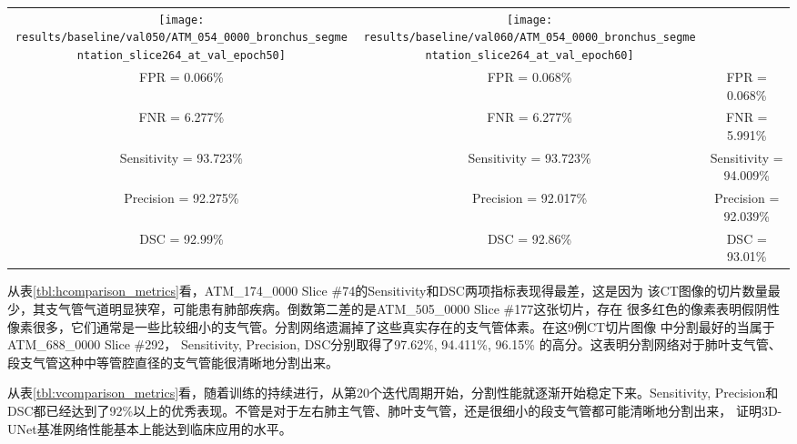\begin{enumerate}
\begin{table}[ht]
{\begin{tabular}{|c|c|c|}
            \texttt{[image: results/baseline/val050/ATM\_054\_0000\_bronchus\_segmentation\_slice264\_at\_val\_epoch50]} & 
            \texttt{[image: results/baseline/val060/ATM\_054\_0000\_bronchus\_segmentation\_slice264\_at\_val\_epoch60]} \\
            FPR = 0.066\%          & FPR = 0.068\%             & FPR = 0.068\% \\
            FNR = 6.277\%          & FNR = 6.277\%             & FNR = 5.991\% \\
            Sensitivity = 93.723\% & Sensitivity = 93.723\%    & Sensitivity = 94.009\% \\
            Precision = 92.275\%   & Precision = 92.017\%      & Precision = 92.039\% \\
            DSC = 92.99\%          & DSC = 92.86\%             & DSC = 93.01\% \\
            \hline
        \end{tabular}
        }
    \end{table}

\end{enumerate}

从表\ref{tbl:hcomparison_metrics}看，ATM\_174\_0000 Slice \#74的Sensitivity和DSC两项指标表现得最差，这是因为
该CT图像的切片数量最少，其支气管气道明显狭窄，可能患有肺部疾病。倒数第二差的是ATM\_505\_0000 Slice \#177这张切片，存在
很多红色的像素表明假阴性像素很多，它们通常是一些比较细小的支气管。分割网络遗漏掉了这些真实存在的支气管体素。在这9例CT切片图像
中分割最好的当属于ATM\_688\_0000 Slice \#292， Sensitivity, Precision, DSC分别取得了97.62\%, 94.411\%, 96.15\%
的高分。这表明分割网络对于肺叶支气管、段支气管这种中等管腔直径的支气管能很清晰地分割出来。

从表\ref{tbl:vcomparison_metrics}看，随着训练的持续进行，从第20个迭代周期开始，分割性能就逐渐开始稳定下来。Sensitivity,
Precision和DSC都已经达到了92\%以上的优秀表现。不管是对于左右肺主气管、肺叶支气管，还是很细小的段支气管都可能清晰地分割出来，
证明3D-UNet基准网络性能基本上能达到临床应用的水平。

